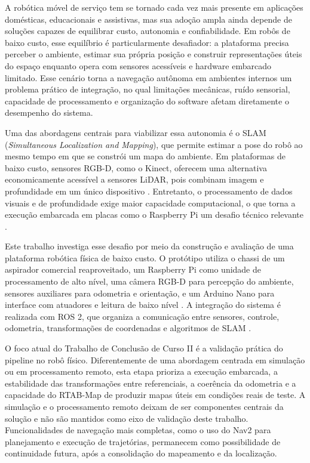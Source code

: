 A robótica móvel de serviço tem se tornado cada vez mais presente em aplicações domésticas, educacionais e assistivas, mas sua adoção ampla ainda depende de soluções capazes de equilibrar custo, autonomia e confiabilidade. Em robôs de baixo custo, esse equilíbrio é particularmente desafiador: a plataforma precisa perceber o ambiente, estimar sua própria posição e construir representações úteis do espaço enquanto opera com sensores acessíveis e hardware embarcado limitado. Esse cenário torna a navegação autônoma em ambientes internos um problema prático de integração, no qual limitações mecânicas, ruído sensorial, capacidade de processamento e organização do software afetam diretamente o desempenho do sistema.

Uma das abordagens centrais para viabilizar essa autonomia é o SLAM (\textit{Simultaneous Localization and Mapping}), que permite estimar a pose do robô ao mesmo tempo em que se constrói um mapa do ambiente. Em plataformas de baixo custo, sensores RGB-D, como o Kinect, oferecem uma alternativa economicamente acessível a sensores LiDAR, pois combinam imagem e profundidade em um único dispositivo \cite{jin2019visualslamrgbd, lemos2019plataformaroboticamovel}. Entretanto, o processamento de dados visuais e de profundidade exige maior capacidade computacional, o que torna a execução embarcada em placas como o Raspberry Pi um desafio técnico relevante \cite{raspberrypi2019raspberrypi, balado2025systematicliteraturereview}.

Este trabalho investiga esse desafio por meio da construção e avaliação de uma plataforma robótica física de baixo custo. O protótipo utiliza o chassi de um aspirador comercial reaproveitado, um Raspberry Pi como unidade de processamento de alto nível, uma câmera RGB-D para percepção do ambiente, sensores auxiliares para odometria e orientação, e um Arduino Nano para interface com atuadores e leitura de baixo nível \cite{arduino2024arduinonano}. A integração do sistema é realizada com ROS 2, que organiza a comunicação entre sensores, controle, odometria, transformações de coordenadas e algoritmos de SLAM \cite{quigley2009rosopensource}.

O foco atual do Trabalho de Conclusão de Curso II é a validação prática do pipeline no robô físico. Diferentemente de uma abordagem centrada em simulação ou em processamento remoto, esta etapa prioriza a execução embarcada, a estabilidade das transformações entre referenciais, a coerência da odometria e a capacidade do RTAB-Map de produzir mapas úteis em condições reais de teste. A simulação e o processamento remoto deixam de ser componentes centrais da solução e não são mantidos como eixo de validação deste trabalho. Funcionalidades de navegação mais completas, como o uso do Nav2 para planejamento e execução de trajetórias, permanecem como possibilidade de continuidade futura, após a consolidação do mapeamento e da localização.

